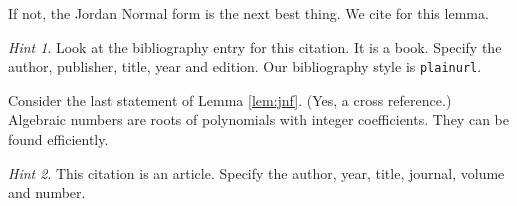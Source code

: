 \documentclass{article}
\theoremstyle{remark}
\newtheorem*{hint}{Hint}
\begin{document}
If not, the Jordan Normal form is the next best thing.
We cite \cite{book:la} for this lemma.
\begin{hint}
	Look at the bibliography entry for this citation.
	It is a book.
	Specify the author, publisher, title, year and edition.
	Our bibliography style is \verb!plainurl!.
\end{hint}
Consider the last statement of Lemma \ref{lem:jnf}. (Yes, a cross reference.)
Algebraic numbers are roots of polynomials with integer coefficients.
They can be found efficiently.
\cite{article:cma}
\begin{hint}
	This citation is an article.
	Specify the author, year, title, journal, volume and number.
\end{hint}


\end{document}
